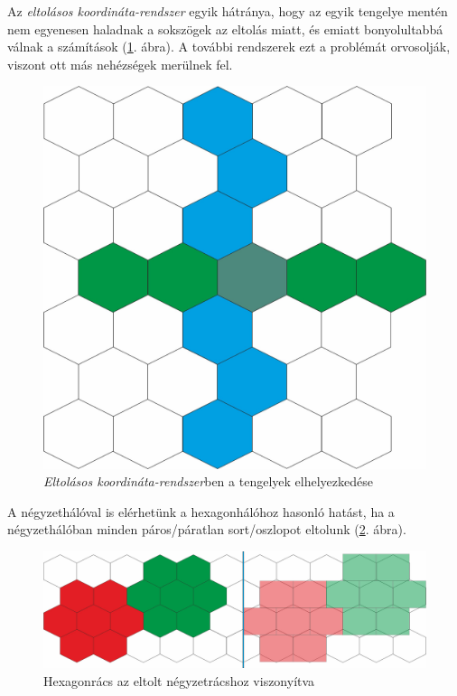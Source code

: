 Az \textit{eltolásos koordináta-rendszer} egyik hátránya, hogy az egyik tengelye mentén nem egyenesen haladnak a sokszögek az eltolás miatt, és emiatt bonyolultabbá válnak a számítások (\ref{fig:OffsetCoord}. ábra). A további rendszerek ezt a problémát orvosolják, viszont ott más nehézségek merülnek fel.	

\begin{figure}[h!]
\centering
\includegraphics[scale=0.2]{kepek/OffsetCoord.jpg}
\caption{\textit{Eltolásos koordináta-rendszer}ben a tengelyek elhelyezkedése}
\label{fig:OffsetCoord}
\end{figure}

A négyzethálóval is elérhetünk a hexagonhálóhoz hasonló hatást, ha a négyzethálóban minden páros/páratlan sort/oszlopot eltolunk (\ref{fig:Hex_Sq}. ábra).

\begin{figure}[h!]
\centering
\includegraphics[scale=0.25]{kepek/Hex_Sq.jpg}
\caption{Hexagonrács az eltolt négyzetrácshoz viszonyítva}
\label{fig:Hex_Sq}
\end{figure}

